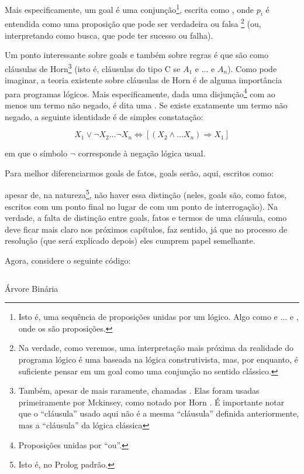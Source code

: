 Mais especificamente, um goal é uma conjunção\footnote{Isto é, uma sequência de proposições unidas
  por um  lógico. Algo como  e
  ... e , onde os  são proposições.}, escrita como , onde $p_i$ é
entendida como uma proposição que pode ser verdadeira ou falsa \footnote{Na verdade, como veremos,
  uma interpretação mais próxima da realidade do programa lógico é uma baseada na lógica
  construtivista, mas, por enquanto, é suficiente pensar em um goal como uma conjunção no sentido
  clássico.} (ou, interpretando como busca, que pode ter sucesso ou falha).

Um ponto interessante sobre goals e também sobre regras é que são como cláusulas de
Horn\footnote{Também, apesar de mais raramente, chamadas . Elas
  foram usadas primeiramente por Mckinsey, como notado por Horn \cite{horn}. É importante notar que
  o ``cláusula'' usado aqui não é a mesma ``cláusula'' definida anteriormente, mas a ``cláusula'' da
lógica clássica} (isto é, cláusulas do
tipo C se $A_1$ e ... e $A_n$). Como pode imaginar, a teoria existente sobre cláusulas de Horn é de
alguma importância para programas lógicos. Mais especificamente, dada uma
disjunção\footnote{Proposições unidas por ``ou''.} com ao menos um termo não negado, é dita uma
. Se existe exatamente um termo não negado, a seguinte identidade é de
simples constatação:

\[
  X_1 \vee \neg X_2 \hdots \neg X_n \Leftrightarrow [(X_2 \wedge \hdots X_n) \Rightarrow X_1]
\]

\noindent em que o símbolo $\neg$ corresponde à negação lógica usual.

Para melhor diferenciarmos goals de fatos, goals serão, aqui, escritos como:

\noindent apesar de, na natureza\footnote{Isto é, no Prolog padrão.}, não haver essa distinção (neles, goals são, como fatos,
escritos com um ponto final no lugar de com um ponto de interrogação). Na verdade, a falta de distinção entre
goals, fatos e termos de uma cláusula, como deve ficar mais claro nos próximos capítulos, faz
sentido, já que no processo de resolução (que será explicado depois) eles cumprem papel semelhante.



Agora, considere o seguinte código:\\

    \begin{listing}
\inputminted{prolog}{../Exemplos/Cap0/prog3_arvb.pl}
\caption{Árvore Binária}\label{lst:arvb}
    \end{listing}

